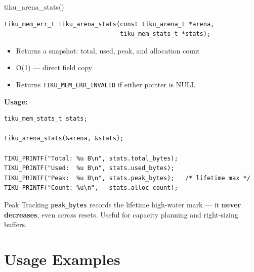 \documentclass[aspectratio=169, 10pt]{beamer}
\begin{document}
\begin{frame}[fragile]{tiku\_arena\_stats()}
\begin{lstlisting}[style=cstyle]
tiku_mem_err_t tiku_arena_stats(const tiku_arena_t *arena,
                                tiku_mem_stats_t *stats);
\end{lstlisting}

\begin{itemize}
  \item Returns a snapshot: total, used, peak, and allocation count
  \item O(1) --- direct field copy
  \item Returns \texttt{TIKU\_MEM\_ERR\_INVALID} if either pointer is NULL
\end{itemize}

\vspace{0.3em}
\textbf{Usage:}
\begin{lstlisting}[style=cstyle]
tiku_mem_stats_t stats;

tiku_arena_stats(&arena, &stats);

TIKU_PRINTF("Total: %u B\n", stats.total_bytes);
TIKU_PRINTF("Used:  %u B\n", stats.used_bytes);
TIKU_PRINTF("Peak:  %u B\n", stats.peak_bytes);   /* lifetime max */
TIKU_PRINTF("Count: %u\n",   stats.alloc_count);
\end{lstlisting}

\vspace{0.3em}
\begin{block}{Peak Tracking}
\texttt{peak\_bytes} records the lifetime high-water mark ---
it \textbf{never decreases}, even across resets.
Useful for capacity planning and right-sizing buffers.
\end{block}
\end{frame}

\section{Usage Examples}
\end{document}
